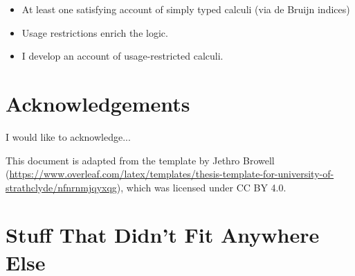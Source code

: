 \documentclass[a4paper,oneside,11pt]{book}
\theoremstyle{definition}
\begin{document}
\begin{itemize}
  \item At least one satisfying account of simply typed calculi
    (via de Bruijn indices)
  \item Usage restrictions enrich the logic.
  \item I develop an account of usage-restricted calculi.
\end{itemize}


\tableofcontents

\listoffigures

\listoftables



\chapter{Acknowledgements}
I would like to acknowledge...

This document is adapted from the template by Jethro Browell
(\url{https://www.overleaf.com/latex/templates/thesis-template-for-university-of-strathclyde/nfnrnmjqyxqg}),
which was licensed under CC BY 4.0.



\mainmatter



%




%





\appendix
\chapter{Stuff That Didn't Fit Anywhere Else}



\end{document}

